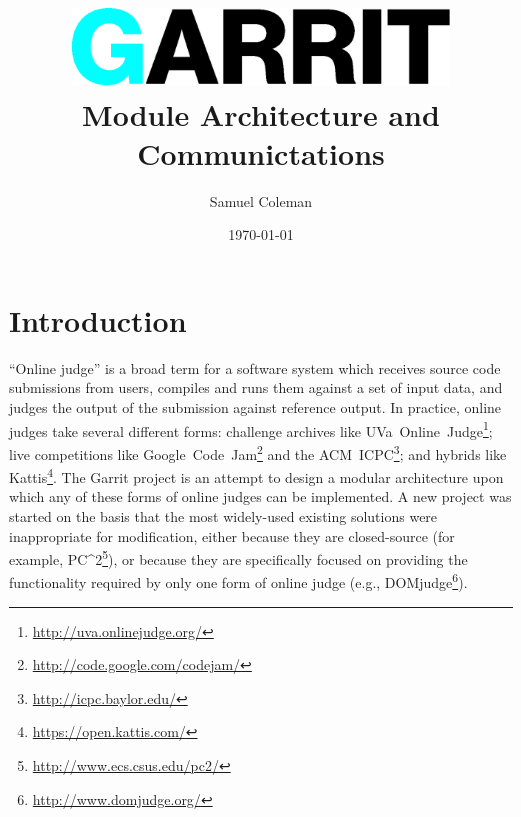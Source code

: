 \documentclass[11pt,letterpaper]{article}
\begin{document}
\title{\includegraphics[width=0.75\textwidth]{logo.eps}\\
Module Architecture and Communictations}
\author{Samuel Coleman}
\date{\today}

\hypersetup{pageanchor=false}
\begin{titlepage}

\maketitle
\thispagestyle{empty}

\end{titlepage}
\hypersetup{pageanchor=true}

\tableofcontents

\newpage

\section{Introduction}
\label{introduction}

``Online judge'' is a broad term for a software system which receives source
code submissions from users, compiles and runs them against a set of input
data, and judges the output of the submission against reference output. In
practice, online judges take several different forms: challenge archives like
UVa~Online~Judge\footnote{\url{http://uva.onlinejudge.org/}}; live competitions
like Google~Code~Jam\footnote{\url{http://code.google.com/codejam/}} and the
ACM~ICPC\footnote{\url{http://icpc.baylor.edu/}}; and hybrids like
Kattis\footnote{\url{https://open.kattis.com/}}. The Garrit project is an
attempt to design a modular architecture upon which any of these forms of
online judges can be implemented. A new project was started on the basis that
the most widely-used existing solutions were inappropriate for modification,
either because they are closed-source (for example,
PC\textasciicircum2\footnote{\url{http://www.ecs.csus.edu/pc2/}}), or because
they are specifically focused on providing the functionality required by only
one form of online judge
(e.g., DOMjudge\footnote{\url{http://www.domjudge.org/}}).
\end{document}
